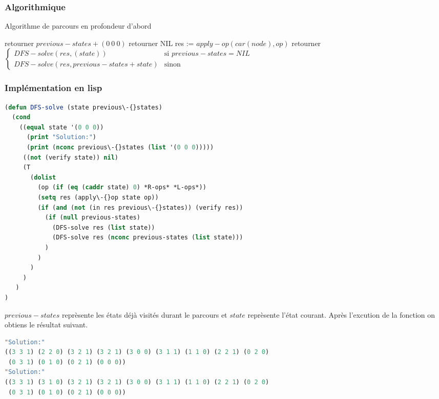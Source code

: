 \documentclass[a4paper, 12pt, leqno]{report}
\theoremstyle{plain}
\begin{document}
             \subsubsection{Algorithmique}     
             \begin{algorithm}
            \caption{Algorithme de parcours en profondeur d'abord}
            \begin{algorithmic}
                \State retourner $previous-states + (0\ 0\ 0)$
                \State retourner NIL
            \Else   
            \State res := $apply-op(car(node),op)$
                    \State retourner $\left\{\begin{array}{ll}
                    DFS-solve(res,(state))&\text{si }previous-states=NIL\\
                    DFS-solve(res,previous-states+state)&\text{sinon}
                    \end{array}\right.$
            \EndIf
            \EndFor
            \EndIf   
            \end{algorithmic}
            \end{algorithm}  
            \subsubsection{Implémentation en lisp}        
            \begin{lstlisting}[label=some-code,caption=DFS-solve (state previous-states) version profondeur d'abord,language=lisp]
(defun DFS-solve (state previous\-{}states)
  (cond
    ((equal state '(0 0 0))
      (print "Solution:")
      (print (nconc previous\-{}states (list '(0 0 0)))))
     ((not (verify state)) nil)
     (T
       (dolist 
         (op (if (eq (caddr state) 0) *R-ops* *L-ops*))
         (setq res (apply\-{}op state op))
         (if (and (not (in res previous\-{}states)) (verify res))
           (if (null previous-states)
             (DFS-solve res (list state))
             (DFS-solve res (nconc previous-states (list state)))
           )
         )
       )
     )
   )  
)
            \end{lstlisting}
          $previous-states$ reprèsente les états déjà visités durant le parcours et $state$ reprèsente l'état courant.\newpage
          Après l'excution de la fonction on obtiens le résultat suivant.
            \begin{lstlisting}[label=some-code,caption=Résultat d'execution de la fonction de parcours en profondeur d'abord.,language=lisp]
"Solution:" 
((3 3 1) (2 2 0) (3 2 1) (3 2 1) (3 0 0) (3 1 1) (1 1 0) (2 2 1) (0 2 0)
 (0 3 1) (0 1 0) (0 2 1) (0 0 0)) 
"Solution:" 
((3 3 1) (3 1 0) (3 2 1) (3 2 1) (3 0 0) (3 1 1) (1 1 0) (2 2 1) (0 2 0)
 (0 3 1) (0 1 0) (0 2 1) (0 0 0)) 
            \end{lstlisting}       

                
\end{document}
